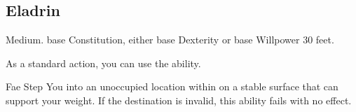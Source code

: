     \subsection{Eladrin}

         Medium.
          base Constitution, either  base Dexterity or  base Willpower
         30 feet.
        \begin{raggeditemize}
             As a standard action, you can use the  ability.
            \begin{freeability}{Fae Step}
                You  into an unoccupied location within \shortrange on a stable surface that can support your weight.
                If the destination is invalid, this ability fails with no effect.


\end{freeability}
\end{raggeditemize}
